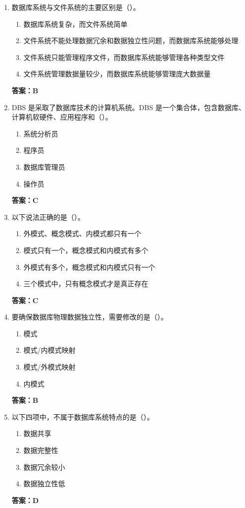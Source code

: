 \documentclass[12pt, a4paper]{article}
\begin{document}
\begin{enumerate}[label=\arabic*.]
	\item 数据库系统与文件系统的主要区别是（\quad）。
	      \begin{enumerate}
		      \item 数据库系统复杂，而文件系统简单
		      \item 文件系统不能处理数据冗余和数据独立性问题，而数据库系统能够处理
		      \item 文件系统只能管理程序文件，而数据库系统能够管理各种类型文件
		      \item 文件系统管理数据量较少，而数据库系统能够管理庞大数据量
	      \end{enumerate}
	      \textbf{答案：B}

	\item DBS 是采取了数据库技术的计算机系统。DBS 是一个集合体，包含数据库、计算机软硬件、应用程序和（\quad）。
	      \begin{enumerate}
		      \item 系统分析员
		      \item 程序员
		      \item 数据库管理员
		      \item 操作员
	      \end{enumerate}
	      \textbf{答案：C}

	\item 以下说法正确的是（\quad）。
	      \begin{enumerate}
		      \item 外模式、概念模式、内模式都只有一个
		      \item 模式只有一个，概念模式和内模式有多个
		      \item 外模式有多个，概念模式和内模式只有一个
		      \item 三个模式中，只有概念模式才是真正存在
	      \end{enumerate}
	      \textbf{答案：C}

	\item 要确保数据库物理数据独立性，需要修改的是（\quad）。
	      \begin{enumerate}
		      \item 模式
		      \item 模式/内模式映射
		      \item 模式/外模式映射
		      \item 内模式
	      \end{enumerate}
	      \textbf{答案：B}

	\item 以下四项中，不属于数据库系统特点的是（\quad）。
	      \begin{enumerate}
		      \item 数据共享
		      \item 数据完整性
		      \item 数据冗余较小
		      \item 数据独立性低
	      \end{enumerate}
	      \textbf{答案：D}


\end{enumerate}
\end{document}
